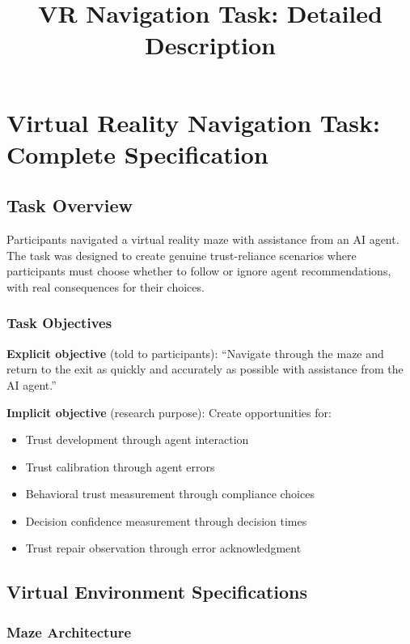 \documentclass[12pt]{article}
\title{\textbf{VR Navigation Task: Detailed Description}}
\date{}
\begin{document}
\maketitle

\section{Virtual Reality Navigation Task: Complete Specification}

\subsection{Task Overview}

Participants navigated a virtual reality maze with assistance from an AI agent. The task was designed to create genuine trust-reliance scenarios where participants must choose whether to follow or ignore agent recommendations, with real consequences for their choices.

\subsubsection{Task Objectives}

\textbf{Explicit objective} (told to participants): ``Navigate through the maze and return to the exit as quickly and accurately as possible with assistance from the AI agent.''

\textbf{Implicit objective} (research purpose): Create opportunities for:
\begin{itemize}
    \item Trust development through agent interaction
    \item Trust calibration through agent errors
    \item Behavioral trust measurement through compliance choices
    \item Decision confidence measurement through decision times
    \item Trust repair observation through error acknowledgment
\end{itemize}

\subsection{Virtual Environment Specifications}

\subsubsection{Maze Architecture}
\end{document}

